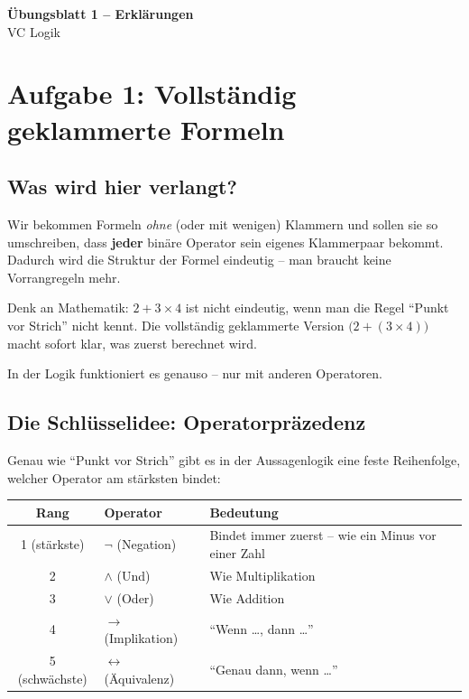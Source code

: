 \documentclass[a4paper,12pt]{article}
\begin{document}
\begin{center}
{\LARGE\bfseries \"Ubungsblatt 1 -- Erkl\"arungen}\\[0.5em]
{\large VC Logik}
\end{center}

\bigskip

\section{Aufgabe 1: Vollst\"andig geklammerte Formeln}

\subsection{Was wird hier verlangt?}

Wir bekommen Formeln \emph{ohne} (oder mit wenigen) Klammern und sollen
sie so umschreiben, dass \textbf{jeder} bin\"are Operator sein eigenes
Klammerpaar bekommt. Dadurch wird die Struktur der Formel eindeutig --
man braucht keine Vorrangregeln mehr.

\begin{analogie}
Denk an Mathematik: $2 + 3 \times 4$ ist nicht eindeutig, wenn man die
Regel "`Punkt vor Strich"' nicht kennt. Die vollst\"andig geklammerte
Version $\bigl(2 + (3 \times 4)\bigr)$ macht sofort klar, was zuerst
berechnet wird.

In der Logik funktioniert es genauso -- nur mit anderen Operatoren.
\end{analogie}

\subsection{Die Schl\"usselidee: Operatorpr\"azedenz}

Genau wie "`Punkt vor Strich"' gibt es in der Aussagenlogik eine feste
Reihenfolge, welcher Operator am st\"arksten bindet:

\begin{center}
\renewcommand{\arraystretch}{1.3}
\begin{tabular}{clp{7cm}}
\toprule
\textbf{Rang} & \textbf{Operator} & \textbf{Bedeutung} \\
\midrule
1 (st\"arkste) & $\neg$ (Negation)       & Bindet immer zuerst -- wie ein Minus vor einer Zahl \\
2              & $\wedge$ (Und)          & Wie Multiplikation \\
3              & $\vee$ (Oder)           & Wie Addition \\
4              & $\to$ (Implikation)     & "`Wenn \ldots, dann \ldots"' \\
5 (schw\"achste) & $\leftrightarrow$ (\"Aquivalenz) & "`Genau dann, wenn \ldots"' \\
\bottomrule
\end{tabular}
\end{center}
\end{document}
